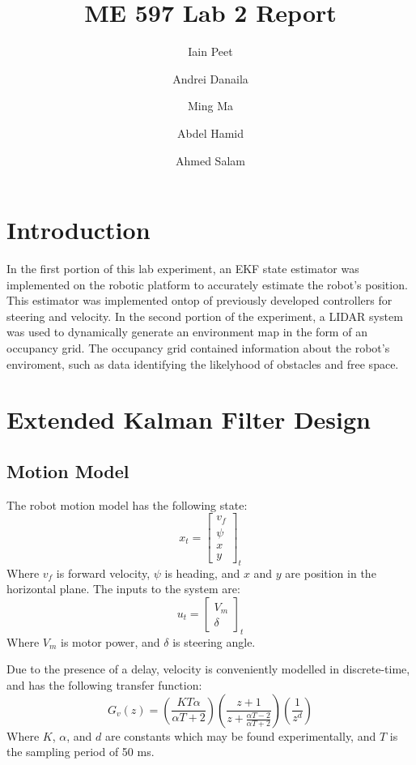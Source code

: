 \documentclass[11pt]{article} %
\title{ME 597 Lab 2 Report}
\author{Iain Peet \and Andrei Danaila \and Ming Ma \and Abdel Hamid \and Ahmed Salam}
\begin{document}
\maketitle

\clearpage

\section{Introduction}

In the first portion of this lab experiment, an EKF state estimator was implemented on the robotic platform to accurately estimate 
the robot's position. This estimator was implemented ontop of previously developed controllers for steering and velocity.
In the second portion of the experiment, a LIDAR system was used to dynamically generate an environment map in the form of an occupancy 
grid. The occupancy grid contained information about the robot's enviroment, such as data identifying the likelyhood of obstacles 
and free space.

\section{Extended Kalman Filter Design}

\subsection{Motion Model}
The robot motion model has the following state:
\begin{equation}
x_t = 
\left[ \begin{array}{c}
v_f \\
\psi \\
x \\
y
\end{array} \right] _t
\end{equation}
Where $v_f$ is forward velocity, $\psi$ is heading, and $x$ and $y$ are position in the horizontal plane.  The inputs to the system are:
\begin{equation}
u_t =
\left[ \begin{array}{c}
V_m \\
\delta
\end{array} \right] _t
\end{equation}
Where $V_m$ is motor power, and $\delta$ is steering angle.

Due to the presence of a delay, velocity is conveniently modelled in discrete-time, and has the following transfer function:
\begin{equation}
G_v(z) =  (\frac{K T \alpha}{\alpha T + 2}) (\frac{z + 1}{z + \frac{\alpha T - 2}{\alpha T + 2}}) (\frac{1}{z^d})
\label{vf}
\end{equation}
Where $K$, $\alpha$, and $d$ are constants which may be found experimentally, and $T$ is the sampling period of 50 ms.
\end{document}

